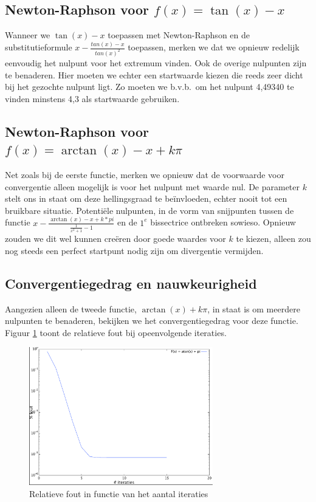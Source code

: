 \documentclass[12pt,a4paper]{article}
\begin{document}
\subsection{Newton-Raphson voor $f(x) = \tan(x) - x$}

Wanneer we $\tan(x) - x$ toepassen met Newton-Raphson en de substitutieformule $x - \frac{tan(x) - x}{tan(x)^2}$ toepassen, merken we dat we opnieuw redelijk eenvoudig het nulpunt voor het extremum vinden. Ook de overige nulpunten zijn te benaderen. Hier moeten we echter een startwaarde kiezen die reeds zeer dicht bij het gezochte nulpunt ligt. Zo moeten we b.v.b.\ om het nulpunt 4,49340 te vinden minstens 4,3 als startwaarde gebruiken.

\subsection{Newton-Raphson voor $f(x) = \arctan(x) - x + k\pi$}

Net zoals bij de eerste functie, merken we opnieuw dat de voorwaarde voor convergentie alleen mogelijk is voor het nulpunt met waarde nul. De parameter $k$ stelt ons in staat om deze hellingsgraad te be\"invloeden, echter nooit tot een bruikbare situatie. Potenti\"ele nulpunten, in de vorm van snijpunten tussen de functie $x - \frac{\arctan(x) - x + k*pi}{\frac{1}{x^2+1} - 1}$ en de $1^e$ bissectrice ontbreken sowieso. Opnieuw zouden we dit wel kunnen cre\"eren door goede waardes voor $k$ te kiezen, alleen zou nog steeds een perfect startpunt nodig zijn om divergentie vermijden.

\subsection{Convergentiegedrag en nauwkeurigheid}

Aangezien alleen de tweede functie, $\arctan(x) + k\pi$, in staat is om meerdere nulpunten te benaderen, bekijken we het convergentiegedrag voor deze functie. Figuur \ref{fig:convergentie-error} toont de relatieve fout bij opeenvolgende iteraties.

\begin{figure}
\begin{center}
 \includegraphics[width=80mm]{resources/convergentie-error.pdf}
 \caption{Relatieve fout in functie van het aantal iteraties}
  \label{fig:convergentie-error}
\end{center}
\end{figure}
\end{document}
